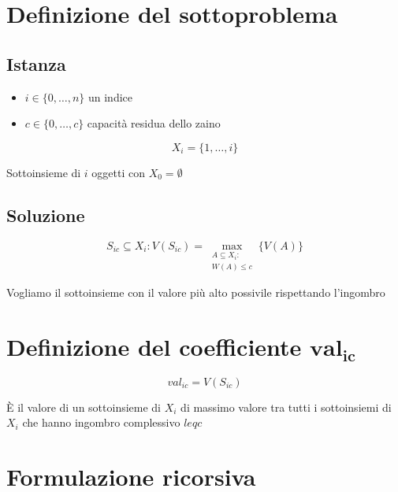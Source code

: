 \section{Definizione del sottoproblema}

\subsection{Istanza}
\begin{itemize}
    \item $i \in \{0, \dots, n\}$ un indice
    \item $c \in \{0, \dots, c\}$ capacità residua dello zaino
\end{itemize}

{
    \large

    $$
        X_i = \{1, \dots, i\}
    $$


}
    \begin{center}
        Sottoinsieme di $i$ oggetti con $X_0 = \emptyset$
    \end{center}

\subsection{Soluzione}
{
    \large

    $$
    S_{ic} \subseteq X_i : V(S_{ic}) = \max_{\substack{A \subseteq X_i : \\ W(A) \leq c}} \{ V(A) \}
    $$


}
    \begin{center}
        Vogliamo il sottoinsieme con il valore più alto possivile rispettando l'ingombro
    \end{center}

\newpage
\section{Definizione del coefficiente $\mathbf{val_{ic}}$}

{
    \large

    $$val_{ic} = V(S_{ic})$$
}

\begin{center}
    È il valore di un sottoinsieme di $X_i$ di massimo valore tra tutti i sottoinsiemi di $X_i$ che hanno ingombro complessivo $leq c$
\end{center}

\section{Formulazione ricorsiva}
